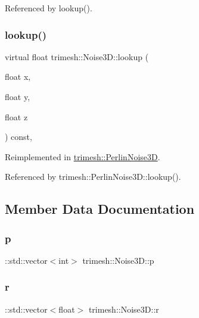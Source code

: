 Referenced by lookup().

\mbox{\label{classtrimesh_1_1Noise3D_a0e2a7259015f580e55b2d171986f0324}} 
\subsubsection{\texorpdfstring{lookup()}{lookup()}}
{\footnotesize\ttfamily virtual float trimesh\+::\+Noise3\+D\+::lookup (\begin{DoxyParamCaption}\item[{float}]{x,  }\item[{float}]{y,  }\item[{float}]{z }\end{DoxyParamCaption}) const\hspace{0.3cm}{\ttfamily [inline]}, {\ttfamily [virtual]}}



Reimplemented in \hyperlink{classtrimesh_1_1PerlinNoise3D_a441ca024ab5b4da722c9d7edfbb98f33}{trimesh\+::\+Perlin\+Noise3D}.



Referenced by trimesh\+::\+Perlin\+Noise3\+D\+::lookup().



\subsection{Member Data Documentation}
\mbox{\label{classtrimesh_1_1Noise3D_aac0d726dd1f44ae92e64b69b04815ea2}} 
\subsubsection{\texorpdfstring{p}{p}}
{\footnotesize\ttfamily \+::std\+::vector$<$int$>$ trimesh\+::\+Noise3\+D\+::p}

\mbox{\label{classtrimesh_1_1Noise3D_a7f5ac7d58acaeec3679916dcb371764f}} 
\subsubsection{\texorpdfstring{r}{r}}
{\footnotesize\ttfamily \+::std\+::vector$<$float$>$ trimesh\+::\+Noise3\+D\+::r}

